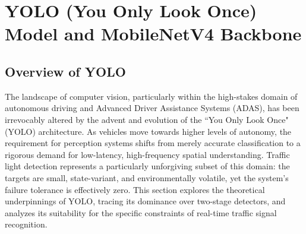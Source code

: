 


\section{YOLO (You Only Look Once) Model and MobileNetV4 Backbone}



\subsection{Overview of YOLO}

The landscape of computer vision, particularly within the high-stakes domain of autonomous driving and Advanced Driver Assistance Systems (ADAS), has been irrevocably altered by the advent and evolution of the {``You Only Look Once"} ({YOLO}) architecture. As vehicles move towards higher levels of autonomy, the requirement for perception systems shifts from merely accurate classification to a rigorous demand for low-latency, high-frequency spatial understanding. Traffic light detection represents a particularly unforgiving subset of this domain: the targets are small, state-variant, and environmentally volatile, yet the system’s failure tolerance is effectively zero. This section explores the theoretical underpinnings of YOLO, tracing its dominance over two-stage detectors, and analyzes its suitability for the specific constraints of real-time traffic signal recognition.


